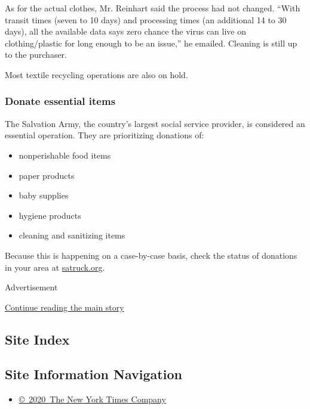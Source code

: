 As for the actual clothes, Mr. Reinhart said the process had not
changed. ``With transit times (seven to 10 days) and processing times
(an additional 14 to 30 days), all the available data says zero chance
the virus can live on clothing/plastic for long enough to be an issue,''
he emailed. Cleaning is still up to the purchaser.

Most textile recycling operations are also on hold.

\hypertarget{donate-essential-items}{%
\subsubsection{Donate essential items}\label{donate-essential-items}}

The Salvation Army, the country's largest social service provider, is
considered an essential operation. They are prioritizing donations of:

\begin{itemize}
\item
  nonperishable food items
\item
  paper products
\item
  baby supplies
\item
  hygiene products
\item
  cleaning and sanitizing items
\end{itemize}

Because this is happening on a case-by-case basis, check the status of
donations in your area at \href{http://satruck.org/}{satruck.org}.

Advertisement

\protect\hyperlink{after-bottom}{Continue reading the main story}

\hypertarget{site-index}{%
\subsection{Site Index}\label{site-index}}

\hypertarget{site-information-navigation}{%
\subsection{Site Information
Navigation}\label{site-information-navigation}}

\begin{itemize}
\tightlist
\item
  \href{https://help.nytimes3xbfgragh.onion/hc/en-us/articles/115014792127-Copyright-notice}{©~2020~The
  New York Times Company}
\end{itemize}

